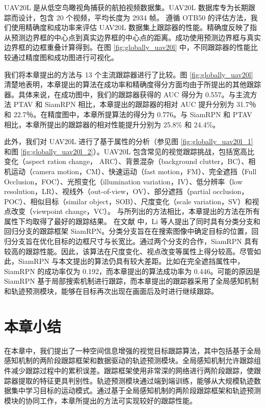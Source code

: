 UAV20L \cite{mueller2016benchmark} 是从低空鸟瞰视角捕获的航拍视频数据集。UAV20L 数据库专为长期跟踪而设计，包含 20 个视频，平均长度为 2934 帧。
遵循 OTB50 \cite{OTB} 的评估方法，我们使用精确度和成功率来评估 UAV20L 数据集上跟踪器的性能。精确度反映了指从预测边界框的中心点到真实边界框的中心点的距离。成功使用预测边界框与真实边界框的边框重叠计算得到。在图 \ref{fig:globally_uav20l} 中，不同跟踪器的性能比较通过精度图和成功图进行可视化。

我们将本章提出的方法与 13 个主流跟踪器进行了比较。图 \ref{fig:globally_uav20l} 清楚地表明，本章提出的算法在成功率和精确度得分方面均由于所提出的其他跟踪器。具体来说，在成功图中，我们的跟踪器获得的 AUC 得分为 0.557。与主流方法 PTAV \cite{fan2018parallel} 和 SiamRPN \cite{SiamRPN} 相比，本章提出的跟踪器的相对 AUC 提升分别为 31.7％ 和 22.7％。在精度图中，本章所提算法的得分为 0.776。与 SiamRPN \cite{SiamRPN} 和 PTAV \cite{fan2018parallel} 相比，本章所提出的跟踪器的相对性能提升分别为 25.8\% 和 24.4\%。

此外，我们对 UAV20L 进行了基于属性的分析（参见图 \ref{fig:globally_uav20l_1} 和图 \ref{fig:globally_uav20l_2}）。UAV20L 包含常见的视觉跟踪挑战，包括宽高比变化（aspect ration change，
ARC）、背景混杂（background clutter，BC）、相机运动（camera motion，CM）、快速运动（fast motion，FM）、完全遮挡（Full Occlusion，FOC）、光照变化（illumination variation，IV）、低分辨率（low resolution，LR）、视线外（out-of-view，OV）、部分遮挡（partial occlusion，POC）、相似目标（similar object，SOB）、尺度变化（scale variation，SV）和视点改变（viewpoint change，VC）。
与所列出的方法相比，本章提出的方法在所有属性下均取得了最好的跟踪结果。
在文献 \cite{SiamRPN} 中，Li 等人提出了同时具有分类分支和回归分支的跟踪框架 SiamRPN。分类分支旨在在搜索图像中确定目标的位置，回归分支旨在优化目标的边框尺寸与长宽比。通过两个分支的合作，SiamRPN 具有较高的跟踪性能。因此，该算法在尺度变化、视点改变等属性上得分较高。尽管如此，SiamRPN 与本文提出的算法仍具有较大差距。比如在完全遮挡属性中，SiamRPN 的成功率仅为 0.192，而本章提出的算法成功率为 0.446。可能的原因是 SiamRPN 基于局部搜索机制进行跟踪，而本章提出的跟踪器采用了全局感知机制和轨迹预测模块，能够在目标再次出现在画面后及时进行继续跟踪。

\section{本章小结}
在本章中，我们提出了一种空间信息增强的视觉目标跟踪算法，其中包括基于全局感知机制的两阶段跟踪框架和数据驱动的轨迹预测模块。全局感知机制允许跟踪组件减少跟踪过程中的累积误差。跟踪框架使用非常深的网络进行两阶段跟踪，使跟踪器提取的特征更具判别性。轨迹预测模块通过端到端训练，能够从大规模轨迹数据集中学习目标的运动模式。通过基于全局感知机制的两阶段跟踪框架和轨迹预测模块的协同工作，本章所提出的方法可实现较好的跟踪性能。
